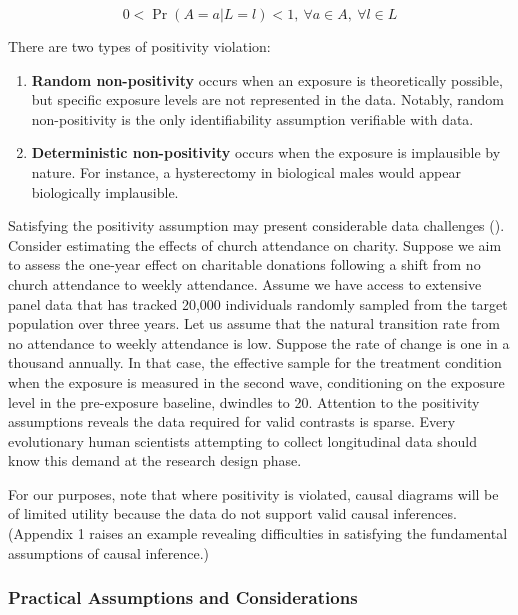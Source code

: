 \documentclass[
  singlecolumn,
  9pt]{article}
\begin{document}
\[
0 < \Pr(A = a | L = l) < 1, ~ \forall a \in A, ~ \forall l \in L
\]

There are two types of positivity violation:

\begin{enumerate}
\def\labelenumi{\arabic{enumi}.}
\item
  \textbf{Random non-positivity} occurs when an exposure is
  theoretically possible, but specific exposure levels are not
  represented in the data. Notably, random non-positivity is the only
  identifiability assumption verifiable with data.
\item
  \textbf{Deterministic non-positivity} occurs when the exposure is
  implausible by nature. For instance, a hysterectomy in biological
  males would appear biologically implausible.
\end{enumerate}

Satisfying the positivity assumption may present considerable data
challenges ().
Consider estimating the effects of church attendance on charity. Suppose
we aim to assess the one-year effect on charitable donations following a
shift from no church attendance to weekly attendance. Assume we have
access to extensive panel data that has tracked 20,000 individuals
randomly sampled from the target population over three years. Let us
assume that the natural transition rate from no attendance to weekly
attendance is low. Suppose the rate of change is one in a thousand
annually. In that case, the effective sample for the treatment condition
when the exposure is measured in the second wave, conditioning on the
exposure level in the pre-exposure baseline, dwindles to 20. Attention
to the positivity assumptions reveals the data required for valid
contrasts is sparse. Every evolutionary human scientists attempting to
collect longitudinal data should know this demand at the research design
phase.

For our purposes, note that where positivity is violated, causal
diagrams will be of limited utility because the data do not support
valid causal inferences. (Appendix 1 raises an example revealing
difficulties in satisfying the fundamental assumptions of causal
inference.)

\subsubsection{Practical Assumptions and
Considerations}\label{practical-assumptions-and-considerations}
\end{document}
